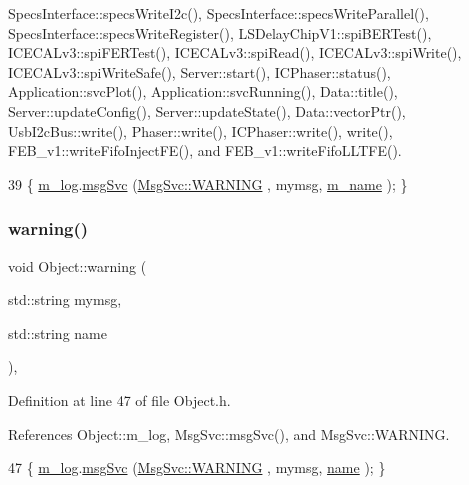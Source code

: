 Specs\+Interface\+::specs\+Write\+I2c(), Specs\+Interface\+::specs\+Write\+Parallel(), Specs\+Interface\+::specs\+Write\+Register(), L\+S\+Delay\+Chip\+V1\+::spi\+B\+E\+R\+Test(), I\+C\+E\+C\+A\+Lv3\+::spi\+F\+E\+R\+Test(), I\+C\+E\+C\+A\+Lv3\+::spi\+Read(), I\+C\+E\+C\+A\+Lv3\+::spi\+Write(), I\+C\+E\+C\+A\+Lv3\+::spi\+Write\+Safe(), Server\+::start(), I\+C\+Phaser\+::status(), Application\+::svc\+Plot(), Application\+::svc\+Running(), Data\+::title(), Server\+::update\+Config(), Server\+::update\+State(), Data\+::vector\+Ptr(), Usb\+I2c\+Bus\+::write(), Phaser\+::write(), I\+C\+Phaser\+::write(), write(), F\+E\+B\+\_\+v1\+::write\+Fifo\+Inject\+F\+E(), and F\+E\+B\+\_\+v1\+::write\+Fifo\+L\+L\+T\+F\+E().


\begin{DoxyCode}
39 \{ \hyperlink{classObject_a0d269813dd7ac1f24bc143031e2963f2}{m\_log}.\hyperlink{classMsgSvc_ad25f18047920cc59a314e5098259711c}{msgSvc} (\hyperlink{classMsgSvc_ae671eb7301996cd049d2da8a65925926a7cefae88f2ba26b2b05b676a383c834b}{MsgSvc::WARNING} , mymsg, \hyperlink{classObject_a8b83c95c705d2c3ba0d081fe1710f48d}{m\_name} ); \}
\end{DoxyCode}
\mbox{\label{classObject_a11f101db4dd73d9391b0231818881d86}} 
\subsubsection{\texorpdfstring{warning()}{warning()}\hspace{0.1cm}{\footnotesize\ttfamily [2/2]}}
{\footnotesize\ttfamily void Object\+::warning (\begin{DoxyParamCaption}\item[{std\+::string}]{mymsg,  }\item[{std\+::string}]{name }\end{DoxyParamCaption})\hspace{0.3cm}{\ttfamily [inline]}, {\ttfamily [inherited]}}



Definition at line 47 of file Object.\+h.



References Object\+::m\+\_\+log, Msg\+Svc\+::msg\+Svc(), and Msg\+Svc\+::\+W\+A\+R\+N\+I\+NG.


\begin{DoxyCode}
47 \{ \hyperlink{classObject_a0d269813dd7ac1f24bc143031e2963f2}{m\_log}.\hyperlink{classMsgSvc_ad25f18047920cc59a314e5098259711c}{msgSvc} (\hyperlink{classMsgSvc_ae671eb7301996cd049d2da8a65925926a7cefae88f2ba26b2b05b676a383c834b}{MsgSvc::WARNING} , mymsg, \hyperlink{classObject_a300f4c05dd468c7bb8b3c968868443c1}{name} ); \}
\end{DoxyCode}
\mbox{\label{classUsbSpiBus_a3ac9d6f5053ddb8b2f8336f2aa88934e}} 
